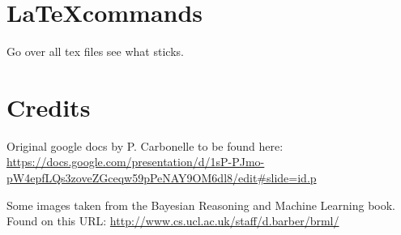 \documentclass[a4paper,10pt]{article}
\begin{document}
\appendix


\section{\LaTeX commands}
Go over all tex files see what sticks.
\section{Credits}


Original google docs by P. Carbonelle to be found here:\\ \url{https://docs.google.com/presentation/d/1sP-PJmo-pW4epfLQs3zoveZGceqw59pPeNAY9OM6dl8/edit#slide=id.p}

Some images taken from the Bayesian Reasoning and Machine Learning book. Found on this URL: \url{http://www.cs.ucl.ac.uk/staff/d.barber/brml/}
\end{document}
